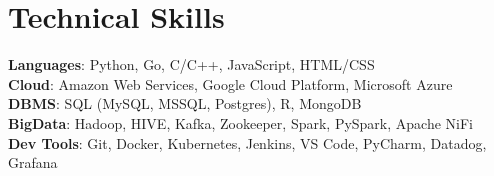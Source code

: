 \documentclass[letterpaper,11pt]{article}
\begin{document}
%
\section{Technical Skills}
 \begin{itemize}[leftmargin=0.15in, label={}]
    \small{\item{
     \textbf{Languages}{: Python, Go, C/C++, JavaScript, HTML/CSS} \\
     \textbf{Cloud}{: Amazon Web Services, Google Cloud Platform, Microsoft Azure} \\
     \textbf{DBMS}{: SQL (MySQL, MSSQL, Postgres), R, MongoDB} \\
     \textbf{BigData}{: Hadoop, HIVE, Kafka, Zookeeper, Spark, PySpark, Apache NiFi} \\
     \textbf{Dev Tools}{: Git, Docker, Kubernetes, Jenkins, VS Code, PyCharm, Datadog, Grafana} \\
    }}
 \end{itemize}


\end{document}
